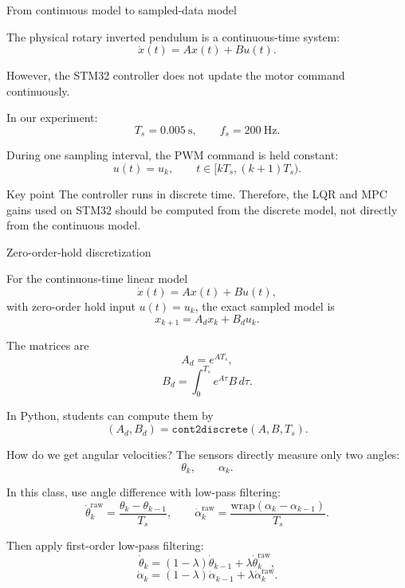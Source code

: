 \documentclass[aspectratio=169]{beamer}
\begin{document}
\begin{frame}{From continuous model to sampled-data model}

The physical rotary inverted pendulum is a continuous-time system:
\[
\dot{x}(t)=Ax(t)+Bu(t).
\]



However, the STM32 controller does not update the motor command continuously.



In our experiment:
\[
T_s=0.005\ \mathrm{s},
\qquad
f_s=200\ \mathrm{Hz}.
\]



During one sampling interval, the PWM command is held constant:
\[
u(t)=u_k,
\qquad
t\in[kT_s,(k+1)T_s).
\]



\begin{block}{Key point}
\small
The controller runs in discrete time. Therefore, the LQR and MPC gains used on STM32 should be computed from the discrete model, not directly from the continuous model.
\end{block}

\end{frame}




\begin{frame}{Zero-order-hold discretization}

For the continuous-time linear model
\[
\dot{x}(t)=Ax(t)+Bu(t),
\]
with zero-order hold input \(u(t)=u_k\), the exact sampled model is
\[
x_{k+1}=A_d x_k+B_d u_k.
\]



The matrices are
\[
A_d=e^{AT_s},
\]
\[
B_d=\int_0^{T_s}e^{A\tau}B\,d\tau.
\]



In Python, students can compute them by
\[
(A_d,B_d)=\texttt{cont2discrete}(A,B,T_s).
\]





\end{frame}






\begin{frame}{How do we get angular velocities?}
The sensors directly measure only two angles:
\[
\theta_k,
\qquad
\alpha_k.
\]

\vspace{0.2cm}

In this class, use angle difference with low-pass filtering:
\[
\dot\theta^{\mathrm{raw}}_k
=
\frac{\theta_k-\theta_{k-1}}{T_s},
\qquad
\dot\alpha^{\mathrm{raw}}_k
=
\frac{\mathrm{wrap}(\alpha_k-\alpha_{k-1})}{T_s}.
\]

\vspace{0.2cm}

Then apply first-order low-pass filtering:
\[
\dot\theta_k=(1-\lambda)\dot\theta_{k-1}+\lambda\dot\theta^{\mathrm{raw}}_k,
\]
\[
\dot\alpha_k=(1-\lambda)\dot\alpha_{k-1}+\lambda\dot\alpha^{\mathrm{raw}}_k.
\]
\end{frame}
\end{document}
